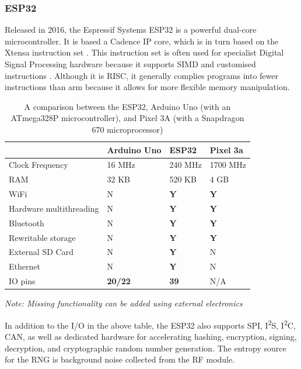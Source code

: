 \documentclass{article}
\begin{document}
\subsubsection{ESP32}

Released in 2016, the Espressif Systems ESP32 is a powerful dual-core microcontroller.
It is based a Cadence IP core, which is in turn based on the Xtensa instruction set \cite{32datasheet}.
This instruction set is often used for specialist Digital Signal Processing hardware because it supports SIMD and customised instructions \cite{lx6datasheet}.
Although it is RISC, it generally complies programs into fewer instructions than arm because it allows for more flexible memory manipulation.

\begin{table}[H]
\begin{tabular}{l|lll}
						& Arduino Uno		& ESP32		& Pixel 3a		\\ \hline
Clock Frequency			& 16 MHz			& 240 MHz		& 1700 MHz		\\ \hline
RAM						& 32 KB				& 520 KB		& 4 GB			\\ \hline
WiFi 					& N 				& \textbf{Y}	& \textbf{Y}	\\ \hline
Hardware multithreading	& N 				& \textbf{Y}	& \textbf{Y}	\\ \hline
Bluetooth				& N 				& \textbf{Y}	& \textbf{Y}	\\ \hline
Rewritable storage		& N 				& \textbf{Y}	& \textbf{Y}	\\ \hline
External SD Card		& N 				& \textbf{Y}	& N				\\ \hline
Ethernet				& N 				& \textbf{Y}	& N				\\ \hline
IO pins					& \textbf{20/22}	& \textbf{39}	& N/A			\\

\end{tabular}
\caption{A comparison between the ESP32, Arduino Uno (with an ATmega328P microcontroller), and Pixel 3A (with a Snapdragon 670 microprocessor)}
\end{table}

\emph{Note: Missing functionality can be added using external electronics}

In addition to the I/O in the above table, the ESP32 also supports SPI, I\textsuperscript{2}S, I\textsuperscript{2}C, CAN, as well as dedicated hardware for accelerating hashing, encryption, signing, decryption, and cryptographic random number generation.
The entropy source for the RNG is background noise collected from the RF module.
\end{document}
